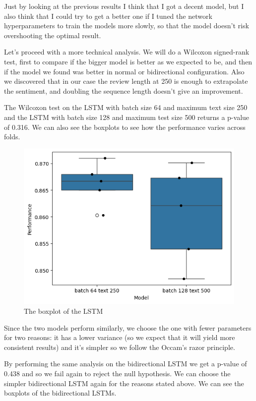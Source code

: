 \documentclass{article}
\begin{document}
Just by looking at the previous results I think that I got a decent model, but I also think that I could try to get a better one if I tuned the network hyperparameters to train the models more slowly, so that the model doesn't risk overshooting the optimal result.

Let's proceed with a more technical analysis.
We will do a Wilcoxon signed-rank test, first to compare if the bigger model is better as we expected to be, and then if the model we found was better in normal or bidirectional configuration.
Also we discovered that in our case the review length at 250 is enough to extrapolate the sentiment, and doubling the sequence length doesn't give an improvement.

The Wilcoxon test on the LSTM with batch size 64 and maximum text size 250 and the LSTM with batch size 128 and maximum test size 500 returns a p-value of 0.316.
We can also see the boxplots to see how the performance varies across folds.

\begin{figure}[htbp]
  \centering
  \includegraphics[width=0.6\linewidth]{img/boxplot_lstm.png}
  \caption{The boxplot of the LSTM}
  \label{fig:lstm_boxplot}
\end{figure}

Since the two models perform similarly, we choose the one with fewer parameters for two reasons: it has a lower variance (so we expect that it will yield more consistent results) and it's simpler so we follow the Occam's razor principle.

By performing the same analysis on the bidirectional LSTM we get a p-value of 0.438 and so we fail again to reject the null hypothesis. We can choose the simpler bidirectional LSTM again for the reasons stated above.
We can see the boxplots of the bidirectional LSTMs.
\end{document}
